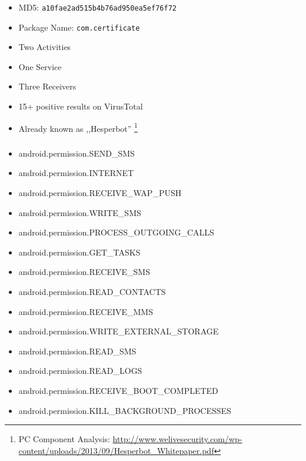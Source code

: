 \documentclass[12pt,a4paper]{beamer}
\begin{document}
\begin{frame}
\frametitle{\certificateIcon}
	
	\begin{itemize}
		\item MD5: \texttt{a10fae2ad515b4b76ad950ea5ef76f72}
		\item Package Name: \texttt{com.certificate}
		\item Two Activities
		\item One Service
		\item Three Receivers
		\item 15+ positive results on VirusTotal
		\item Already known as ,,Hesperbot'' \footnote{PC Component Analysis: \url{http://www.welivesecurity.com/wp-content/uploads/2013/09/Hesperbot\_Whitepaper.pdf}}
	\end{itemize}

\end{frame}

\begin{frame}

\frametitle{\certificateIcon}
\end{frame}


\begin{frame}
\frametitle{\certificateIcon}
	\begin{itemize}
\item android.permission.SEND\_SMS
\item android.permission.INTERNET
\item android.permission.RECEIVE\_WAP\_PUSH
\item android.permission.WRITE\_SMS
\item android.permission.PROCESS\_OUTGOING\_CALLS
\item android.permission.GET\_TASKS
\item android.permission.RECEIVE\_SMS
\item android.permission.READ\_CONTACTS
\item android.permission.RECEIVE\_MMS
\item android.permission.WRITE\_EXTERNAL\_STORAGE
\item android.permission.READ\_SMS
\item android.permission.READ\_LOGS
\item android.permission.RECEIVE\_BOOT\_COMPLETED
\item android.permission.KILL\_BACKGROUND\_PROCESSES
	\end{itemize}
\end{frame}
\end{document}

